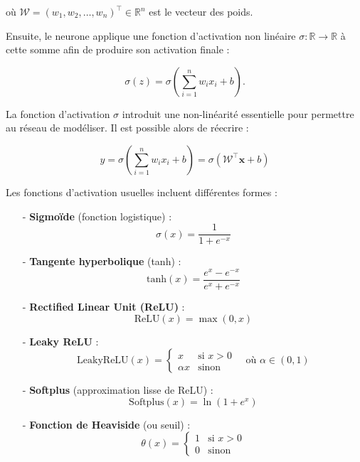 où \( \mathbf{\mathcal{W}} = (w_1, w_2, \dots, w_n)^\top \in \mathbb{R}^n \) est le vecteur des poids.

Ensuite, le neurone applique une fonction d’activation non linéaire \( \sigma : \mathbb{R} \rightarrow \mathbb{R} \) à cette somme afin de produire son activation finale :

\begin{equation}
\sigma(z) = \sigma\left( \sum_{i=1}^{n} w_i x_i + b \right).
\end{equation}

La fonction d’activation \( \sigma \) introduit une non-linéarité essentielle pour permettre au réseau de modéliser. Il est possible alors de réecrire : 

\begin{equation}
y = \sigma \left(\sum_{i=1}^{n} w_i x_i + b\right) = \sigma (\mathbf{\mathcal{W}}^\top \mathbf{x} + b) 
\label{eq:perceptron}
\end{equation}

Les fonctions d’activation usuelles incluent différentes formes :

\begin{itemize}
    \item[-] \textbf{Sigmoïde} (fonction logistique) :
    \[
    \sigma(x) = \frac{1}{1 + e^{-x}}
    \]
    
    \item[-] \textbf{Tangente hyperbolique} (tanh) : 
    \[
    \text{tanh}(x) = \frac{e^{x} - e^{-x}}{e^{x} + e^{-x}}
    \]
    
    \item[-] \textbf{Rectified Linear Unit (ReLU)} :
    \[
    \text{ReLU}(x) = \max(0, x)
    \]
    
    \item[-] \textbf{Leaky ReLU} :
    \[
    \text{LeakyReLU}(x) = 
    \begin{cases}
    x & \text{si } x > 0 \\
    \alpha x & \text{sinon}
    \end{cases}
    \quad \text{où } \alpha \in (0,1) 
    \]
    
    \item[-] \textbf{Softplus} (approximation lisse de ReLU) :
    \[
    \text{Softplus}(x) = \ln(1 + e^x)
    \]
    
    \item[-] \textbf{Fonction de Heaviside} (ou seuil) :
    \[
    \theta(x) = 
    \begin{cases}
    1 & \text{si } x > 0 \\
    0 & \text{sinon}
    \end{cases}
    \]
\end{itemize}

